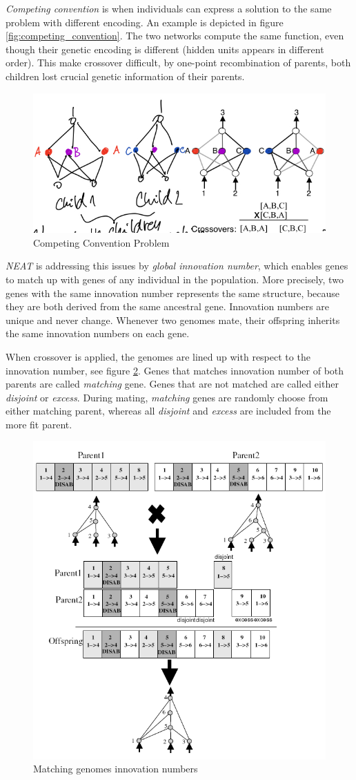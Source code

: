 \documentclass[format=acmsmall, review=false, screen=true]{acmart}
\begin{document}
\emph{Competing convention} is when individuals can express a solution to the same problem with different encoding. An example is depicted in figure \ref{fig:competing_convention}. The two networks compute the same function, even though their genetic encoding is different (hidden units appears in different order). This make crossover difficult, by one-point recombination of parents, both children lost crucial genetic information of their parents.

\begin{figure}[H]
  \includegraphics[width=0.66\linewidth]{img/competing_convention.JPEG}
  \caption{\label{fig:genome}Competing Convention Problem}
\end{figure}

\emph{NEAT} is addressing this issues by \emph{global innovation number}, which enables genes to match up with genes of any individual in the population. More precisely, two genes with the same innovation number represents the same structure, because they are both derived from the same ancestral gene. Innovation numbers are unique and never change. Whenever two genomes mate, their offspring inherits the same innovation numbers on each gene.

When crossover is applied, the genomes are lined up with respect to the innovation number, see figure \ref{fig:crossover}. Genes that matches innovation number of both parents are called \emph{matching} gene. Genes that are not matched are called either \emph{disjoint} or \emph{excess}. During mating, \emph{matching} genes are randomly choose from either matching parent, whereas all \emph{disjoint} and \emph{excess} are included from the more fit parent.

\begin{figure}[H]
  \includegraphics[width=0.66\linewidth]{img/crossover.PNG}
  \caption{\label{fig:crossover}Matching genomes innovation numbers}
\end{figure}
\end{document}
